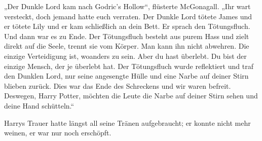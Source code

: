 „Der Dunkle Lord kam nach Godric’s Hollow“, flüsterte McGonagall.
„Ihr wart versteckt, doch jemand hatte euch verraten. Der Dunkle Lord tötete James und er tötete Lily und er kam schließlich an dein Bett. Er sprach den Tötungsfluch. Und dann war es zu Ende. Der Tötungsfluch besteht aus purem Hass und zielt direkt auf die Seele, trennt sie vom Körper. Man kann ihn nicht abwehren. Die einzige Verteidigung ist, woanders zu sein. Aber du hast überlebt. Du bist der einzige Mensch, der je überlebt hat. Der Tötungsfluch wurde reflektiert und traf den Dunklen Lord, nur seine angesengte Hülle und eine Narbe auf deiner Stirn blieben zurück. Dies war das Ende des Schreckens und wir waren befreit. Deswegen, Harry Potter, möchten die Leute die Narbe auf deiner Stirn sehen und deine Hand schütteln.“

Harrys Trauer hatte längst all seine Tränen aufgebraucht; er konnte nicht mehr weinen, er war nur noch erschöpft.

